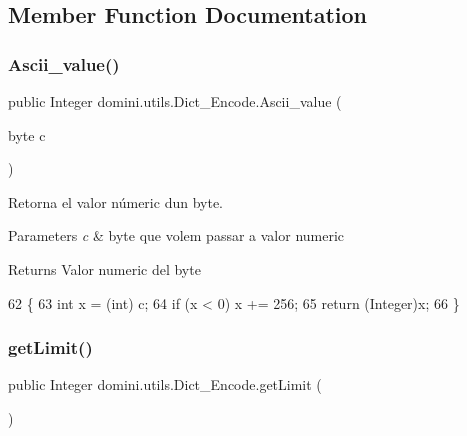\subsection{Member Function Documentation}
\mbox{\label{classdomini_1_1utils_1_1Dict__Encode_a12e23ecdd9b0078cb6e56c01126248b9}} 
\subsubsection{\texorpdfstring{Ascii\+\_\+value()}{Ascii\_value()}}
{\footnotesize\ttfamily public Integer domini.\+utils.\+Dict\+\_\+\+Encode.\+Ascii\+\_\+value (\begin{DoxyParamCaption}\item[{byte}]{c }\end{DoxyParamCaption})\hspace{0.3cm}{\ttfamily [inline]}}



Retorna el valor númeric d\textquotesingle{}un byte. 


\begin{DoxyParams}{Parameters}
{\em c} & byte que volem passar a valor numeric \\
\hline
\end{DoxyParams}
\begin{DoxyReturn}{Returns}
Valor numeric del byte 
\end{DoxyReturn}

\begin{DoxyCode}
62                                        \{
63         \textcolor{keywordtype}{int} x = (int) c;
64         \textcolor{keywordflow}{if} (x < 0) x += 256;
65         \textcolor{keywordflow}{return} (Integer)x;
66     \}
\end{DoxyCode}
\mbox{\label{classdomini_1_1utils_1_1Dict__Encode_a21a05b62b848a7ab9fbdf49a3a6e7edf}} 
\subsubsection{\texorpdfstring{get\+Limit()}{getLimit()}}
{\footnotesize\ttfamily public Integer domini.\+utils.\+Dict\+\_\+\+Encode.\+get\+Limit (\begin{DoxyParamCaption}{ }\end{DoxyParamCaption})\hspace{0.3cm}{\ttfamily [inline]}}

